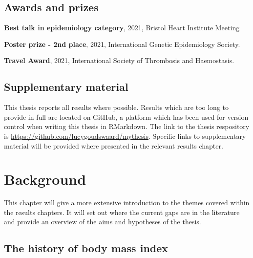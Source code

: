 \documentclass[11pt,twoside]{bristolthesis}
\begin{document}
\hypertarget{awards-and-prizes}{%
\section{Awards and prizes}\label{awards-and-prizes}}

\textbf{Best talk in epidemiology category}, 2021, Bristol Heart Institute Meeting

\textbf{Poster prize - 2nd place}, 2021, International Genetic Epidemiology Society.

\textbf{Travel Award}, 2021, International Society of Thrombosis and Haemostasis.

\hypertarget{supplementary-material}{%
\section{Supplementary material}\label{supplementary-material}}

This thesis reports all results where possible. Results which are too long to provide in full are located on GitHub, a platform which has been used for version control when writing this thesis in RMarkdown. The link to the thesis respository is \url{https://github.com/lucygoudswaard/mythesis}. Specific links to supplementary material will be provided where presented in the relevant results chapter.

\hypertarget{background}{%
\chapter{Background}\label{background}}

This chapter will give a more extensive introduction to the themes covered within the results chapters. It will set out where the current gaps are in the literature and provide an overview of the aims and hypotheses of the thesis.

\hypertarget{the-history-of-body-mass-index}{%
\section{The history of body mass index}\label{the-history-of-body-mass-index}}
\end{document}
